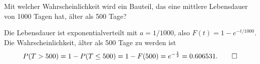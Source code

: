 Mit welcher Wahrscheinlichkeit wird ein Bauteil, das eine mittlere Lebensdauer
von 1000 Tagen hat, älter als 500 Tage?


\begin{loesung}
Die Lebensdauer ist exponentialverteilt mit $a=1/1000$, also
$F(t)=1-e^{-t/1000}$. Die Wahrscheinlichkeit, älter als 500 Tage
zu werden ist
\[
P(T > 500)=1-P(T\le 500)=1-F(500)=e^{-\frac12}=0.606531.
\qedhere
\]
\end{loesung}
